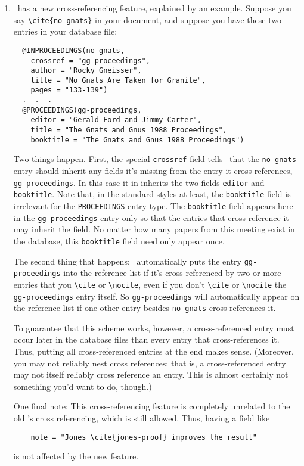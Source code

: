 \begin{enumerate}
\item
\BibTeX\ has a new cross-referencing feature,
explained by an example.
Suppose you say \hbox{\verb|\cite{no-gnats}|} in your document,
and suppose you have these two entries in your database file:
\begin{verbatim}
  @INPROCEEDINGS(no-gnats,
    crossref = "gg-proceedings",
    author = "Rocky Gneisser",
    title = "No Gnats Are Taken for Granite",
    pages = "133-139")
  .  .  .
  @PROCEEDINGS(gg-proceedings,
    editor = "Gerald Ford and Jimmy Carter",
    title = "The Gnats and Gnus 1988 Proceedings",
    booktitle = "The Gnats and Gnus 1988 Proceedings")
\end{verbatim}
Two things happen.
First, the special \hbox{\tt crossref} field tells \BibTeX\
that the \hbox{\tt no-gnats} entry should inherit
any fields it's missing from
the entry it cross references, \hbox{\tt gg-proceedings}.
In this case it in inherits the two fields
\hbox{\tt editor} and \hbox{\tt booktitle}.
Note that, in the standard styles at least,
the \hbox{\tt booktitle} field is irrelevant
for the \hbox{\tt PROCEEDINGS} entry type.
The \hbox{\tt booktitle} field appears here
in the \hbox{\tt gg-proceedings} entry
only so that the entries that cross reference it
may inherit the field.
No matter how many papers from this meeting exist in the database,
this \hbox{\tt booktitle} field need only appear once.

The second thing that happens:
\BibTeX\ automatically puts the entry \hbox{\tt gg-proceedings}
into the reference list if it's cross
referenced by two or more entries that you
\verb|\cite| or \hbox{\verb|\nocite|},
even if you don't \verb|\cite| or \hbox{\verb|\nocite|}
the \hbox{\tt gg-proceedings} entry itself.
So \hbox{\tt gg-proceedings} will automatically appear
on the reference list if one other entry
besides \hbox{\tt no-gnats} cross references it.

To guarantee that this scheme works, however,
a cross-referenced entry must occur later in the database files
than every entry that cross-references it.
Thus, putting all cross-referenced entries at the end makes sense.
(Moreover, you may not reliably nest cross references;
that is, a cross-referenced entry may
not itself reliably cross reference an entry.
This is almost certainly not something you'd
want to do, though.)

One final note:
This cross-referencing feature is completely unrelated
to the old \BibTeX's cross referencing,
which is still allowed.
Thus, having a field like
\begin{verbatim}
    note = "Jones \cite{jones-proof} improves the result"
\end{verbatim}
is not affected by the new feature.


\end{enumerate}
